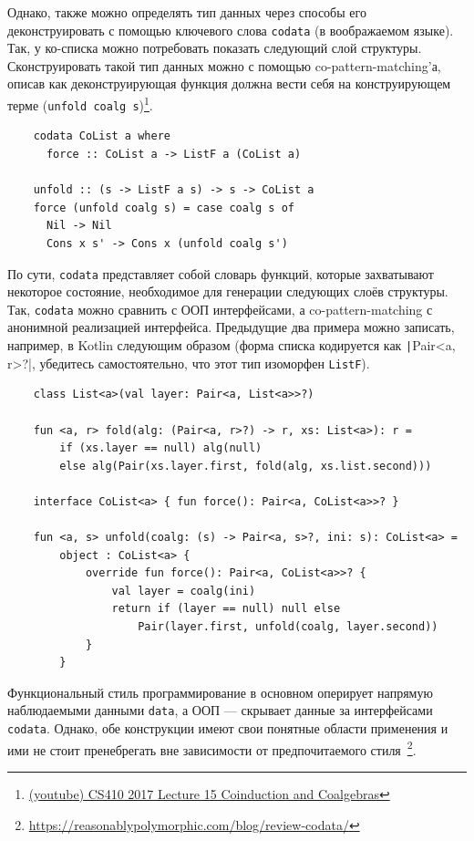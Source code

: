 Однако, также можно определять тип данных через способы его деконструировать с помощью ключевого слова \texttt{codata} (в воображаемом языке).
Так, у ко-списка можно потребовать показать следующий слой структуры.
Сконструировать такой тип данных можно с помощью co-pattern-matching'а, описав как деконструирующая функция должна вести себя на конструирующем терме (\texttt{unfold coalg s})\footnote{\href{https://youtu.be/ZCdYIEwcna0?si=XEQSBFhnehQFZPxy}{(youtube) CS410 2017 Lecture 15 Coinduction and Coalgebras}}.
\begin{verbatim}
    codata CoList a where
      force :: CoList a -> ListF a (CoList a)

    unfold :: (s -> ListF a s) -> s -> CoList a
    force (unfold coalg s) = case coalg s of
      Nil -> Nil
      Cons x s' -> Cons x (unfold coalg s')
\end{verbatim}

По сути, \texttt{codata} представляет собой словарь функций, которые захватывают некоторое состояние, необходимое для генерации следующих слоёв структуры.
Так, \texttt{codata} можно сравнить с ООП интерфейсами, а co-pattern-matching с анонимной реализацией интерфейса.
Предыдущие два примера можно записать, например, в Kotlin следующим образом (форма списка кодируется как \texttt|Pair<a, r>?|, убедитесь самостоятельно, что этот тип изоморфен \texttt{ListF}).
\begin{verbatim}
    class List<a>(val layer: Pair<a, List<a>>?)

    fun <a, r> fold(alg: (Pair<a, r>?) -> r, xs: List<a>): r =
        if (xs.layer == null) alg(null)
        else alg(Pair(xs.layer.first, fold(alg, xs.list.second)))

    interface CoList<a> { fun force(): Pair<a, CoList<a>>? }

    fun <a, s> unfold(coalg: (s) -> Pair<a, s>?, ini: s): CoList<a> =
        object : CoList<a> {
            override fun force(): Pair<a, CoList<a>>? {
                val layer = coalg(ini)
                return if (layer == null) null else
                    Pair(layer.first, unfold(coalg, layer.second))
            }
        }
\end{verbatim}

Функциональный стиль программирование в основном оперирует напрямую наблюдаемыми данными \texttt{data}, а ООП --- скрывает данные за интерфейсами \texttt{codata}.
Однако, обе конструкции имеют свои понятные области применения и ими не стоит пренебрегать вне зависимости от предпочитаемого стиля~\cite{downen2019codata}\footnote{\url{https://reasonablypolymorphic.com/blog/review-codata/}}.

